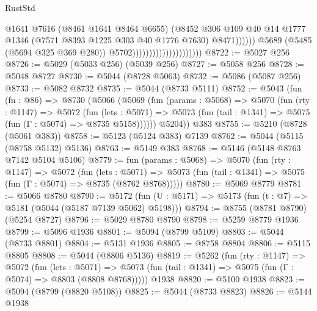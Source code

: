 \begin{lexlean}{RustStd}
\begin{coremodule}
                                                        @1641
                                                        @7616
                                                        (@8461 @1641 @8464 @6655)
                                                        (@8452
                                                          @306
                                                          @109
                                                          @40
                                                          @14
                                                          @1777
                                                          @1346
                                                          (@7571 @8393 @1225 @303 @40 @1776 @7630)
                                                          @8471))))))
                                              @5689
                                              (@5485 (@5694 @325 @369 @280))
                                              @5702)))))))))))))))))))))
@8722 := @5027 @256
@8726 := @5029 (@5033 @256) (@5039 @256)
@8727 := @5058 @256
@8728 := @5048 @8727
@8730 := @5044 (@8728 @5063)
@8732 := @5086 (@5087 @256)
@8733 := @5082 @8732
@8735 := @5044 (@8733 @5111)
@8752 := @5043
    (fun (fn : @86) =>
    @8730
      (@5066
        (@5069
          (fun (params : @5068) =>
          @5070
            (fun (rty : @1147) =>
            @5072
              (fun (lets : @5071) =>
              @5073 (fun (tail : @1341) => @5075 (fun (Γ : @5074) => @8735 @5158))))))
        @5204))
    @383
@8755 := @5210 (@8728 (@5061 @383))
@8758 := @5123 (@5124 @383) @7139
@8762 := @5044 (@5115 (@8758 @5132) @5136)
@8763 := @5149 @383
@8768 := @5146 (@5148 @8763 @7142 @5104 @5106)
@8779 := fun (params : @5068) =>
  @5070
    (fun (rty : @1147) =>
    @5072
      (fun (lets : @5071) =>
      @5073 (fun (tail : @1341) => @5075 (fun (Γ : @5074) => @8735 (@8762 @8768)))))
@8780 := @5069 @8779
@8781 := @5066 @8780
@8790 := @5172 (fun (U : @5171) => @5173 (fun (t : @7) => @5181 (@5044 (@5187 @7139 @5062) @5198)))
@8794 := @8755 (@8781 @8790) (@5254 @8727)
@8796 := @5029 @8780 @8790
@8798 := @5259 @8779 @1936
@8799 := @5096 @1936
@8801 := @5094 (@8799 @5109)
@8803 := @5044 (@8733 @8801)
@8804 := @5131 @1936
@8805 := @8758 @8804
@8806 := @5115 @8805
@8808 := @5044 (@8806 @5136)
@8819 := @5262
    (fun (rty : @1147) =>
    @5072
      (fun (lets : @5071) =>
      @5073 (fun (tail : @1341) => @5075 (fun (Γ : @5074) => @8803 (@8808 @8768)))))
    @1938
@8820 := @5100 @1938
@8823 := @5094 (@8799 (@8820 @5108))
@8825 := @5044 (@8733 @8823)
@8826 := @5144 @1938

\end{coremodule}
\end{lexlean}

